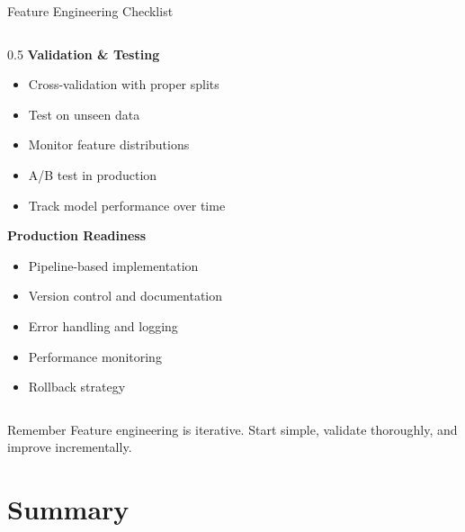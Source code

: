 \documentclass[aspectratio=169,11pt]{beamer}
\begin{document}
\begin{frame}{Feature Engineering Checklist}
\begin{columns}
\begin{column}{0.5\textwidth}
\vspace{0.3cm}
\textbf{Validation \& Testing}
\begin{itemize}
\item[$\square$] Cross-validation with proper splits
\item[$\square$] Test on unseen data
\item[$\square$] Monitor feature distributions
\item[$\square$] A/B test in production
\item[$\square$] Track model performance over time
\end{itemize}

\vspace{0.3cm}
\textbf{Production Readiness}
\begin{itemize}
\item[$\square$] Pipeline-based implementation
\item[$\square$] Version control and documentation
\item[$\square$] Error handling and logging
\item[$\square$] Performance monitoring
\item[$\square$] Rollback strategy
\end{itemize}
\end{column}
\end{columns}

\begin{alertblock}{Remember}
Feature engineering is iterative. Start simple, validate thoroughly, and improve incrementally.
\end{alertblock}
\end{frame}

\section{Summary}
\end{document}
